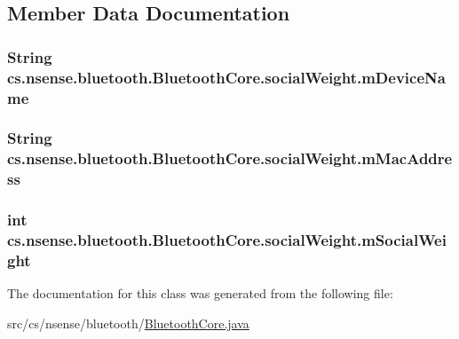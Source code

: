 \subsection{Member Data Documentation}
\hypertarget{classcs_1_1nsense_1_1bluetooth_1_1_bluetooth_core_1_1social_weight_aaf47801138c51e9779795c6fdd276319}{
\subsubsection[{m\-Device\-Name}]{\setlength{\rightskip}{0pt plus 5cm}String cs.\-nsense.\-bluetooth.\-Bluetooth\-Core.\-social\-Weight.\-m\-Device\-Name}}\label{classcs_1_1nsense_1_1bluetooth_1_1_bluetooth_core_1_1social_weight_aaf47801138c51e9779795c6fdd276319}
\hypertarget{classcs_1_1nsense_1_1bluetooth_1_1_bluetooth_core_1_1social_weight_a5284a73386cab1ccb3148fed0570b58c}{
\subsubsection[{m\-Mac\-Address}]{\setlength{\rightskip}{0pt plus 5cm}String cs.\-nsense.\-bluetooth.\-Bluetooth\-Core.\-social\-Weight.\-m\-Mac\-Address}}\label{classcs_1_1nsense_1_1bluetooth_1_1_bluetooth_core_1_1social_weight_a5284a73386cab1ccb3148fed0570b58c}
\hypertarget{classcs_1_1nsense_1_1bluetooth_1_1_bluetooth_core_1_1social_weight_af370031de2ab5a72911677a7d7211887}{
\subsubsection[{m\-Social\-Weight}]{\setlength{\rightskip}{0pt plus 5cm}int cs.\-nsense.\-bluetooth.\-Bluetooth\-Core.\-social\-Weight.\-m\-Social\-Weight}}\label{classcs_1_1nsense_1_1bluetooth_1_1_bluetooth_core_1_1social_weight_af370031de2ab5a72911677a7d7211887}


The documentation for this class was generated from the following file\-:\begin{DoxyCompactItemize}
\item 
src/cs/nsense/bluetooth/\hyperlink{_bluetooth_core_8java}{Bluetooth\-Core.\-java}\end{DoxyCompactItemize}
